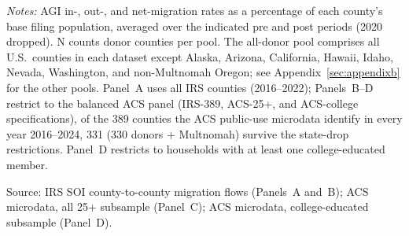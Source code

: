\begin{table}[!ht]
\begin{threeparttable}
\begin{tablenotes}[flushleft]
\footnotesize
\setlength{\itemsep}{1pt}
\item \textit{Notes:} AGI in-, out-, and net-migration rates as a percentage of each county's base filing population, averaged over the indicated pre and post periods (2020 dropped). N counts donor counties per pool. The all-donor pool comprises all U.S.\ counties in each dataset except Alaska, Arizona, California, Hawaii, Idaho, Nevada, Washington, and non-Multnomah Oregon; see Appendix~\ref{sec:appendixb} for the other pools. Panel~A uses all IRS counties (2016--2022); Panels~B--D restrict to the balanced ACS panel (IRS-389, ACS-25+, and ACS-college specifications), of the 389 counties the ACS public-use microdata identify in every year 2016--2024, 331 (330 donors $+$ Multnomah) survive the state-drop restrictions. Panel~D restricts to households with at least one college-educated member.
\item Source: IRS SOI county-to-county migration flows (Panels~A and~B); ACS microdata, all 25+ subsample (Panel~C); ACS microdata, college-educated subsample (Panel~D).
\end{tablenotes}
\end{threeparttable}
\end{table}

